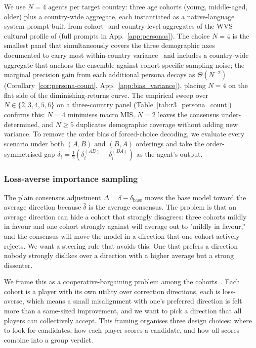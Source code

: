 \documentclass{article}
\begin{document}

We use $N{=}4$ agents per target country: three age cohorts (young, middle-aged, older) plus a country-wide aggregate, each instantiated as a native-language system prompt built from cohort- and country-level aggregates of the WVS cultural profile of \citet{greco2026personas} (full prompts in App.~\ref{app:personas}). The choice $N{=}4$ is the smallest panel that simultaneously covers the three demographic axes documented to carry most within-country variance~\citep{inglehart2005modernization} and includes a country-wide aggregate that anchors the ensemble against cohort-specific sampling noise; the marginal precision gain from each additional persona decays as $\Theta(N^{-2})$ (Corollary~\ref{cor:persona-count}, App.~\ref{app:bias_variance}), placing $N{=}4$ on the flat side of the diminishing-returns curve. The empirical sweep over $N\in\{2,3,4,5,6\}$ on a three-country panel (Table~\ref{tab:r3_persona_count}) confirms this: $N{=}4$ minimises macro MIS, $N{=}2$ leaves the consensus under-determined, and $N{\geq}5$ duplicates demographic coverage without adding new variance. To remove the order bias of forced-choice decoding, we evaluate every scenario under both $(A,B)$ and $(B,A)$ orderings and take the order-symmetrised gap $\delta_i = \tfrac{1}{2}(\delta_i^{(AB)} - \delta_i^{(BA)})$ as the agent's output.

\subsubsection{Loss-averse importance sampling}
\label{sec:method:estimator:pt}

The plain consensus adjustment $\Delta = \bar\delta - 
\delta_{\text{base}}$ moves the base model toward the average direction because $\bar\delta$ is the average consensus. The problem is that an average direction can hide a cohort that strongly disagrees: three cohorts mildly in favour and one cohort strongly against will average out to "mildly in favour," and the consensus will move the model in a direction 
that one cohort actively rejects. We want a steering rule that 
avoids this. One that prefers a direction nobody strongly 
dislikes over a direction with a higher average but a strong 
dissenter.

We frame this as a cooperative-bargaining problem among the 
cohorts~\citep{nash1950bargaining, kalai1975other}. Each cohort 
is a player with its own utility over correction directions,
each is loss-averse, which means a small misalignment with one's preferred
direction is felt more than a same-sized improvement, and we
want to pick a direction that all players can collectively
accept. This framing organises three design choices: where to
look for candidates, how each player scores a candidate, and how all scores combine into a group verdict.
\end{document}
